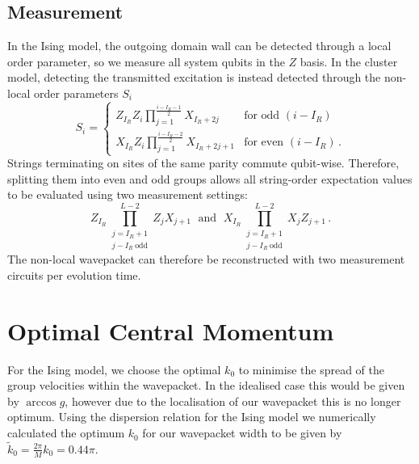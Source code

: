 \documentclass[aps,floatfix,10pt,amssymb,amsfont,amsmath,superscriptaddress,float,nofootinbib,longbibliography,nobalancelastpage,twocolumn]{revtex4-2}
\begin{document}
\subsection{Measurement}
In the Ising model, the outgoing domain wall can be detected through a local order parameter, so we measure all system qubits in the $Z$ basis. In the cluster model, detecting the transmitted excitation is instead detected through the non-local order parameters $S_i$
\begin{equation}
S_i = \begin{cases}Z_{I_R}Z_{i}\prod_{j=1}^{\frac{i-I_R-1}{2}}X_{I_R+2j} & \text{for odd } (i-I_R)\\
    X_{I_R}Z_{i}\prod_{j=1}^{\frac{i-I_R-2}{2}}X_{I_R+2j+1} &\text{for even }  (i-I_R)\,.
    \end{cases}
    \label{eq:Si}
\end{equation}
Strings terminating on sites of the same parity commute qubit-wise. Therefore, splitting them into even and odd groups allows all string-order expectation values to be evaluated using two measurement settings:
\begin{equation}
    Z_{I_R}\prod_{\substack{j=I_R+1\\ j-I_R\ \text{odd}}}^{L-2} Z_{j}X_{j+1} \;\text{ and }\;  X_{I_R}\prod_{\substack{j=I_R+1\\ j-I_R\ \text{odd}}}^{L-2} X_{j}Z_{j+1}\,.
\end{equation}
The non-local wavepacket can therefore be reconstructed with two measurement circuits per evolution time.
\section{Optimal Central Momentum}
\label{app:optimalk}
For the Ising model, we choose the optimal $k_0$ to minimise the spread of the group velocities within the wavepacket. In the idealised case this would be given by $\arccos g$, however due to the localisation of our wavepacket this is no longer optimum. Using the dispersion relation for the Ising model we numerically calculated the optimum $k_0$ for our wavepacket width to be given by $\tilde k_0 = \frac{2\pi }{M}k_0=0.44\pi$.
\end{document}
